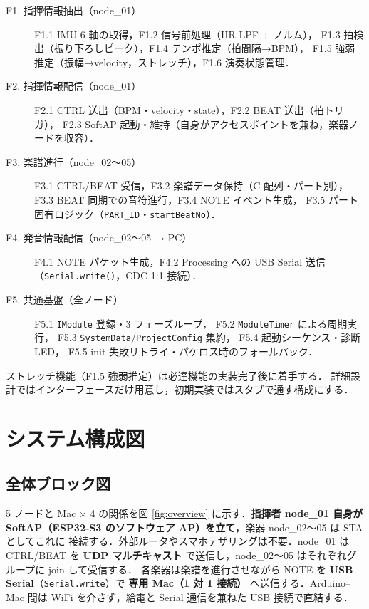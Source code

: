 \documentclass[lualatex,book,paper=a4paper,jafontsize=11.5pt,jafontscale=1.05]{jlreq}
\begin{document}
\begin{description}
  \item[F1. 指揮情報抽出（node\_01）]
    F1.1 IMU 6 軸の取得，F1.2 信号前処理（IIR LPF + ノルム），
    F1.3 拍検出（振り下ろしピーク），F1.4 テンポ推定（拍間隔→BPM），
    F1.5 強弱推定（振幅→velocity，ストレッチ），F1.6 演奏状態管理．
  \item[F2. 指揮情報配信（node\_01）]
    F2.1 CTRL 送出（BPM・velocity・state），F2.2 BEAT 送出（拍トリガ），
    F2.3 SoftAP 起動・維持（自身がアクセスポイントを兼ね，楽器ノードを収容）．
  \item[F3. 楽譜進行（node\_02〜05）]
    F3.1 CTRL/BEAT 受信，F3.2 楽譜データ保持（C 配列・パート別），
    F3.3 BEAT 同期での音符進行，F3.4 NOTE イベント生成，
    F3.5 パート固有ロジック（\texttt{PART\_ID}・\texttt{startBeatNo}）．
  \item[F4. 発音情報配信（node\_02〜05 → PC）]
    F4.1 NOTE パケット生成，F4.2 Processing への USB Serial 送信
    （\texttt{Serial.write()}，CDC 1:1 接続）．
  \item[F5. 共通基盤（全ノード）]
    F5.1 \texttt{IModule} 登録・3 フェーズループ，
    F5.2 \texttt{ModuleTimer} による周期実行，
    F5.3 \texttt{SystemData}/\texttt{ProjectConfig} 集約，
    F5.4 起動シーケンス・診断 LED，
    F5.5 init 失敗リトライ・パケロス時のフォールバック．
\end{description}

ストレッチ機能（F1.5 強弱推定）は必達機能の実装完了後に着手する．
詳細設計ではインターフェースだけ用意し，初期実装ではスタブで通す構成にする．


\section{システム構成図}\label{sec:basic-architecture}

\subsection{全体ブロック図}

5 ノードと Mac × 4 の関係を図 \ref{fig:overview} に示す．\textbf{指揮者 node\_01 自身が
SoftAP（ESP32-S3 のソフトウェア AP）を立て}，楽器 node\_02〜05 は STA としてこれに
接続する．外部ルータやスマホテザリングは不要．node\_01 は CTRL/BEAT を
\textbf{UDP マルチキャスト} で送信し，node\_02〜05 はそれぞれグループに join して受信する．
各楽器は楽譜を進行させながら NOTE を \textbf{USB Serial}（\texttt{Serial.write}）で
\textbf{専用 Mac（1 対 1 接続）} へ送信する．Arduino--Mac 間は WiFi を介さず，給電と
Serial 通信を兼ねた USB 接続で直結する．
\end{document}
